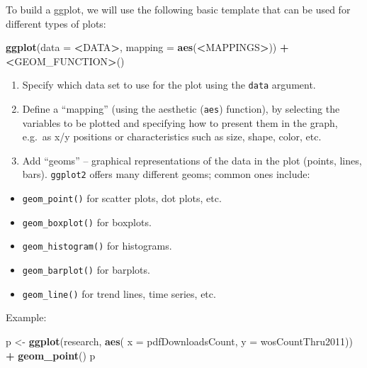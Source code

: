 \documentclass[
]{book}
\newenvironment{Shaded}{\begin{snugshade}}{\end{snugshade}}
\newcommand{\DataTypeTok}[1]{\textcolor[rgb]{0.13,0.29,0.53}{#1}}
\newcommand{\ErrorTok}[1]{\textcolor[rgb]{0.64,0.00,0.00}{\textbf{#1}}}
\newcommand{\KeywordTok}[1]{\textcolor[rgb]{0.13,0.29,0.53}{\textbf{#1}}}
\newcommand{\NormalTok}[1]{#1}
\newcommand{\OperatorTok}[1]{\textcolor[rgb]{0.81,0.36,0.00}{\textbf{#1}}}
\newcommand{\StringTok}[1]{\textcolor[rgb]{0.31,0.60,0.02}{#1}}
\providecommand{\tightlist}{%
  \setlength{\itemsep}{0pt}\setlength{\parskip}{0pt}}
\begin{document}
To build a ggplot, we will use the following basic template that can be used for different types of plots:

\begin{Shaded}
\begin{Highlighting}[]
\KeywordTok{ggplot}\NormalTok{(}\DataTypeTok{data =} \OperatorTok{<}\NormalTok{DATA}\OperatorTok{>}\NormalTok{, }\DataTypeTok{mapping =} \KeywordTok{aes}\NormalTok{(}\OperatorTok{<}\NormalTok{MAPPINGS}\OperatorTok{>}\NormalTok{)) }\OperatorTok{+}\StringTok{ }\ErrorTok{<}\NormalTok{GEOM_FUNCTION}\OperatorTok{>}\NormalTok{()}
\end{Highlighting}
\end{Shaded}

\begin{enumerate}
\def\labelenumi{\arabic{enumi}.}
\item
  Specify which data set to use for the plot using the \texttt{data} argument.
\item
  Define a ``mapping'' (using the aesthetic (\texttt{aes}) function), by selecting the variables to be plotted and specifying how to present them in the graph, e.g.~as x/y positions or characteristics such as size, shape, color, etc.
\item
  Add ``geoms'' -- graphical representations of the data in the plot (points, lines, bars). \texttt{ggplot2} offers many different geoms; common ones include:
\end{enumerate}

\begin{itemize}
\tightlist
\item
  \texttt{geom\_point()} for scatter plots, dot plots, etc.
\item
  \texttt{geom\_boxplot()} for boxplots.
\item
  \texttt{geom\_histogram()} for histograms.
\item
  \texttt{geom\_barplot()} for barplots.
\item
  \texttt{geom\_line()} for trend lines, time series, etc.
\end{itemize}

Example:

\begin{Shaded}
\begin{Highlighting}[]
\NormalTok{p <-}\StringTok{ }\KeywordTok{ggplot}\NormalTok{(research, }\KeywordTok{aes}\NormalTok{( }\DataTypeTok{x =}\NormalTok{ pdfDownloadsCount, }\DataTypeTok{y =}\NormalTok{ wosCountThru2011)) }\OperatorTok{+}\StringTok{ }\KeywordTok{geom_point}\NormalTok{()}
\NormalTok{p}
\end{Highlighting}
\end{Shaded}
\end{document}
